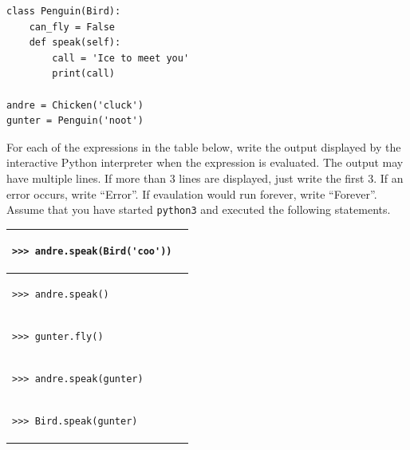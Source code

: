 \documentclass{exam}
\begin{document}
\begin{questions}
\begin{lstlisting}
class Penguin(Bird):
    can_fly = False
    def speak(self):
        call = 'Ice to meet you'
        print(call)

andre = Chicken('cluck')
gunter = Penguin('noot')
\end{lstlisting}
\clearpage
For each of the expressions in the table below, write the output displayed by the interactive Python interpreter when the expression is evaluated. The output may have multiple lines. If more than 3 lines are displayed, just write the first 3. If an error occurs, write “Error”. If evaulation would run forever, write “Forever”.\\
Assume that you have started \texttt{python3} and executed the following statements.

\begin{center}
\begin{tabular}{ |p{8cm}|p{6cm}| } 
 \hline
 \begin{lstlisting}
>>> andre.speak(Bird('coo'))
\end{lstlisting} &  \\  \hline
 \begin{lstlisting}
>>> andre.speak()
\end{lstlisting} &  \\  \hline
 \begin{lstlisting}
>>> gunter.fly()
\end{lstlisting} &  \\  \hline
 \begin{lstlisting}
>>> andre.speak(gunter)
\end{lstlisting} &  \\  \hline
 \begin{lstlisting}
>>> Bird.speak(gunter)
\end{lstlisting} &  \\  \hline
\end{tabular}
\end{center}
\end{questions}
\clearpage
\end{document}
